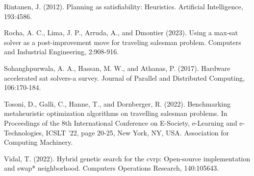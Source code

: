 \documentclass[10pt]{article}
\begin{document}
Rintanen, J. (2012). Planning as satisfiability: Heuristics. Artificial Intelligence, 193:4586.

Rocha, A. C., Lima, J. P., Arruda, A., and Dmontier (2023). Using a max-sat solver as a post-improvement move for traveling salesman problem. Computers and Industrial Engineering, 2:908-916.

Sohanghpurwala, A. A., Hassan, M. W., and Athanas, P. (2017). Hardware accelerated sat solvers-a survey. Journal of Parallel and Distributed Computing, 106:170-184.

Tosoni, D., Galli, C., Hanne, T., and Dornberger, R. (2022). Benchmarking metaheuristic optimization algorithms on travelling salesman problems. In Proceedings of the 8th International Conference on E-Society, e-Learning and e-Technologies, ICSLT '22, page 20-25, New York, NY, USA. Association for Computing Machinery.

Vidal, T. (2022). Hybrid genetic search for the cvrp: Open-source implementation and swap* neighborhood. Computers Operations Research, 140:105643.
\end{document}
